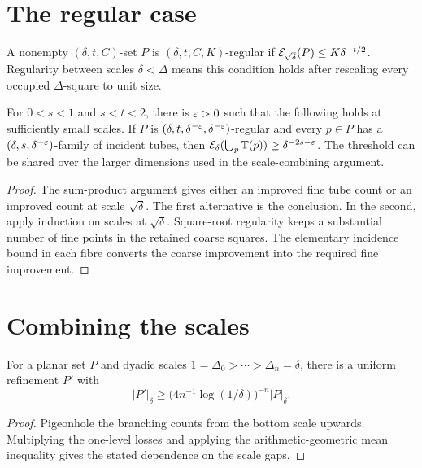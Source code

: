 \section{The regular case}

\begin{definition}
\label{def:os-regular}
\leanok
{}
A nonempty $(\delta,t,C)$-set $P$ is
$(\delta,t,C,K)$-regular if
$\mathcal{E}_{\sqrt\delta}(P)\leq K\delta^{-t/2}$.
Regularity between scales $\delta<\Delta$ means this condition
holds after rescaling every occupied $\Delta$-square to unit size.
\end{definition}

\begin{theorem}
\label{thm:os-regular}
\leanok
{}
For $0<s<1$ and $s<t<2$, there is $\varepsilon>0$ such that the
following holds at sufficiently small scales. If $P$ is
$(\delta,t,\delta^{-\varepsilon},\delta^{-\varepsilon})$-regular and every
$p\in P$ has a $(\delta,s,\delta^{-\varepsilon})$-family of incident
tubes, then $\mathcal{E}_\delta(\bigcup_p\mathbb{T}(p))\geq\delta^{-2s-\varepsilon}$.
The threshold can be shared over the larger dimensions used in
the scale-combining argument.
\end{theorem}
\begin{proof}
\leanok
The sum-product argument gives either an improved fine tube count
or an improved count at scale $\sqrt\delta$. The first alternative
is the conclusion. In the second, apply induction on scales at
$\sqrt\delta$. Square-root regularity keeps a substantial number
of fine points in the retained coarse squares. The elementary
incidence bound in each fibre converts the coarse improvement
into the required fine improvement.
\end{proof}

\section{Combining the scales}

\begin{lemma}
\label{lem:os-uniformization}
For a planar set $P$ and dyadic scales
$1=\Delta_0>\cdots>\Delta_n=\delta$, there is a uniform
refinement $P'$ with
\[
       |P'|_\delta\geq
          \bigl(4n^{-1}\log(1/\delta)\bigr)^{-n}|P|_\delta.
\]
\end{lemma}
\begin{proof}
Pigeonhole the branching counts from the bottom scale upwards.
Multiplying the one-level losses and applying the arithmetic-geometric
mean inequality gives the stated dependence on the scale gaps.
\end{proof}

